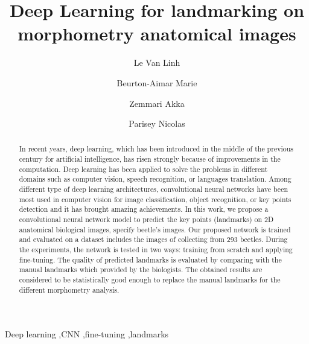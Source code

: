 \documentclass[review]{elsarticle}
\begin{document}
\begin{frontmatter}

\title{Deep Learning for landmarking on morphometry anatomical images}


\author[labri,itdlu]{Le Van Linh}
\author[labri]{Beurton-Aimar Marie}
\author[labri]{Zemmari Akka}
\author[igepp]{Parisey Nicolas}


\address[labri]{University of Bordeaux, 351, cours de la Libération, 33405 Talence, France}

\address[igepp]{UMR 1349 IGEPP, BP 35327, 35653 Le Rheu, France}
\address[itdlu]{Dalat University, Dalat, Lamdong, Vietnam}

\begin{abstract}
In recent years, deep learning, which has been introduced in the middle of the previous century for artificial intelligence, has risen strongly because of improvements in the computation. Deep learning has been applied to solve the problems in different domains such as computer vision, speech recognition, or languages translation. Among different type of deep learning architectures, convolutional neural networks have been most used in computer vision for image classification, object recognition, or key points detection and it has brought amazing achievements. In this work, we propose a convolutional neural network model to predict the key points (landmarks) on 2D anatomical biological images, specify beetle's images. Our proposed network is trained and evaluated on a dataset includes the images of collecting from $293$ beetles. During the experiments, the network is tested in two ways: training from scratch and applying fine-tuning. The quality of predicted landmarks is evaluated by comparing with the manual landmarks which provided by the biologists. The obtained results are considered to be statistically good enough to replace the manual landmarks for the different morphometry analysis.
\end{abstract}

\begin{keyword}
Deep learning \sep CNN \sep fine-tuning \sep landmarks
\end{keyword}

\end{frontmatter}
\end{document}
